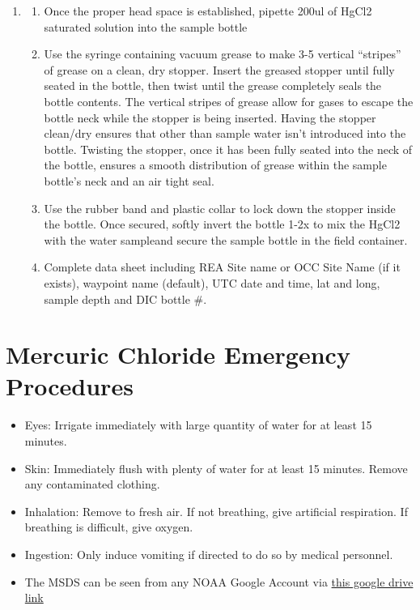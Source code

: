 \documentclass[]{book}
\providecommand{\tightlist}{%
  \setlength{\itemsep}{0pt}\setlength{\parskip}{0pt}}
\begin{document}
\begin{enumerate}
\item
  \begin{enumerate}
  \def\labelenumii{\alph{enumii}.}
  \tightlist
  \item
    Once the proper head space is established, pipette 200ul of HgCl2 saturated solution into the sample bottle
  \item
    Use the syringe containing vacuum grease to make 3-5 vertical ``stripes'' of grease on a clean, dry stopper. Insert the greased stopper until fully seated in the bottle, then twist until the grease completely seals the bottle contents. The vertical stripes of grease allow for gases to escape the bottle neck while the stopper is being inserted. Having the stopper clean/dry ensures that other than sample water isn't introduced into the bottle. Twisting the stopper, once it has been fully seated into the neck of the bottle, ensures a smooth distribution of grease within the sample bottle's neck and an air tight seal.
  \item
    Use the rubber band and plastic collar to lock down the stopper inside the bottle. Once secured, softly invert the bottle 1-2x to mix the HgCl2 with the water sampleand secure the sample bottle in the field container.
  \item
    Complete data sheet including REA Site name or OCC Site Name (if it exists), waypoint name (default), UTC date and time, lat and long, sample depth and DIC bottle \#.
  \end{enumerate}
\end{enumerate}

\hypertarget{mercuric-chloride-emergency-procedures}{%
\section{Mercuric Chloride Emergency Procedures}\label{mercuric-chloride-emergency-procedures}}

\begin{itemize}
\tightlist
\item
  Eyes: Irrigate immediately with large quantity of water for at least 15 minutes.
\item
  Skin: Immediately flush with plenty of water for at least 15 minutes. Remove any contaminated clothing.
\item
  Inhalation: Remove to fresh air. If not breathing, give artificial respiration. If breathing is difficult, give oxygen.
\item
  Ingestion: Only induce vomiting if directed to do so by medical personnel.
\item
  The MSDS can be seen from any NOAA Google Account via \href{https://drive.google.com/open?id=12w0Kmi8VVE9n_0A5_BhNVq6l4nMDtM1K}{this google drive link}
\end{itemize}
\end{document}

